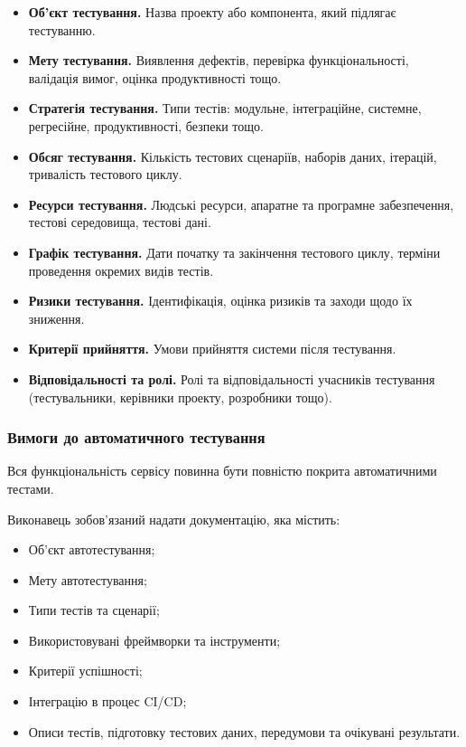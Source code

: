 \documentclass{article}
\begin{document}
\begin{itemize}
    \item \textbf{Об'єкт тестування.} Назва проекту або компонента, який підлягає тестуванню.
    \item \textbf{Мету тестування.} Виявлення дефектів, перевірка функціональності, валідація вимог, оцінка продуктивності тощо.
    \item \textbf{Стратегія тестування.} Типи тестів: модульне, інтеграційне, системне, регресійне, продуктивності, безпеки тощо.
    \item \textbf{Обсяг тестування.} Кількість тестових сценаріїв, наборів даних, ітерацій, тривалість тестового циклу.
    \item \textbf{Ресурси тестування.} Людські ресурси, апаратне та програмне забезпечення, тестові середовища, тестові дані.
    \item \textbf{Графік тестування.} Дати початку та закінчення тестового циклу, терміни проведення окремих видів тестів.
    \item \textbf{Ризики тестування.} Ідентифікація, оцінка ризиків та заходи щодо їх зниження.
    \item \textbf{Критерії прийняття.} Умови прийняття системи після тестування.
    \item \textbf{Відповідальності та ролі.} Ролі та відповідальності учасників тестування (тестувальники, керівники проекту, розробники тощо).
\end{itemize}

\subsubsection{Вимоги до автоматичного тестування}

Вся функціональність сервісу повинна бути повністю покрита автоматичними тестами.

Виконавець зобов’язаний надати документацію, яка містить:
\begin{itemize}
    \item Об’єкт автотестування;
    \item Мету автотестування;
    \item Типи тестів та сценарії;
    \item Використовувані фреймворки та інструменти;
    \item Критерії успішності;
    \item Інтеграцію в процес CI/CD;
    \item Описи тестів, підготовку тестових даних, передумови та очікувані результати.
\end{itemize}
\end{document}

